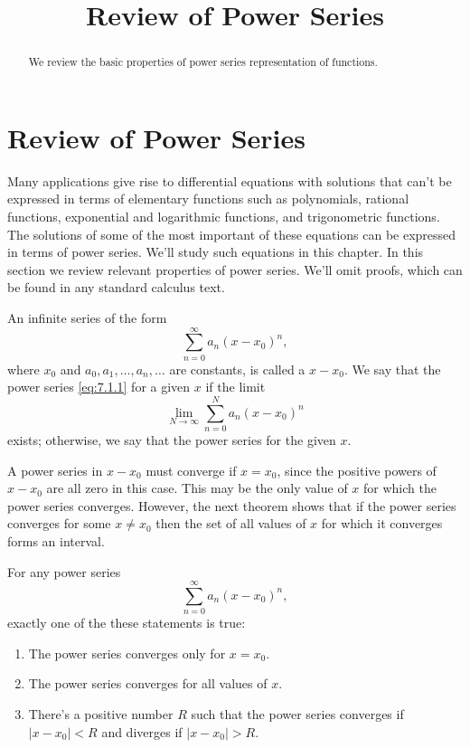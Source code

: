 \documentclass{ximera}
\title{Review of Power Series}%
\begin{document}
\begin{abstract}
We review the basic properties of power series representation of functions.
\end{abstract}

\maketitle

\section*{Review of Power Series}

Many applications give rise to differential equations with solutions
that can't be expressed in terms of elementary functions such as
polynomials, rational functions, exponential and logarithmic
functions, and trigonometric functions. The solutions of some of the
most important of these equations can be expressed in terms of power
series. We'll study such equations in this chapter. In this section
we review relevant properties of power series. We'll omit proofs,
which can be found in any standard calculus text.

\begin{definition}\label{thmtype:7.1.1}
An infinite series of the form
\begin{equation} \label{eq:7.1.1}
\sum_{n=0}^\infty a_n(x-x_0)^n,
\end{equation}
where $x_0$ and $a_0, a_1, \dots, a_n, \dots$ are constants, is
called a
 $x-x_0$. We say that the power series
\eqref{eq:7.1.1}  for a given $x$ if the limit
$$
\lim_{N\rightarrow\infty}
\sum_{n=0}^Na_n(x-x_0)^n
$$
exists; otherwise, we say that the power series   for
the given $x$.
\end{definition}

A power series in $x-x_0$ must converge if $x=x_0$, since the positive
powers of $x-x_0$ are all zero in this case. This may be the only
value of $x$ for which the power series converges. However, the
next theorem shows that if the power series converges for some
$x\neq
x_0$ then the set of all values of $x$ for which it converges forms an interval.

\begin{theorem}\label{thmtype:7.1.2}
For any power series
$$
\sum_{n=0}^\infty a_n(x-x_0)^n,
$$
exactly one of the these statements is true$:$
\begin{enumerate}
\item\label{item:7.1.2a} %
The power series converges  only for $x=x_0.$
\item\label{item:7.1.2b} %
The power series converges for all values of $x.$
\item\label{item:7.1.2c} %
There's a positive number $R$ such that  the power series
converges if $|x-x_0|<R$ and diverges if  $|x-x_0|>R$.
\end{enumerate}
\end{theorem}
\end{document}
